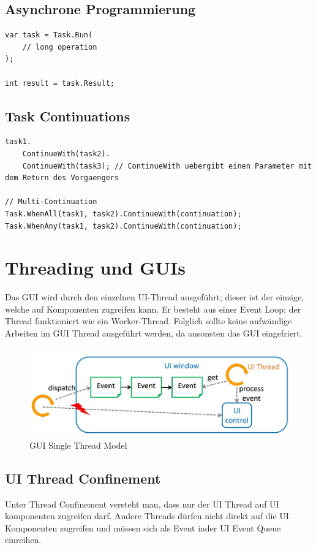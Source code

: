 \subsection{Asynchrone Programmierung}
\begin{lstlisting}[language={[Sharp]C}]
var task = Task.Run(
	// long operation
);

int result = task.Result;
\end{lstlisting}

\subsection{Task Continuations}
\begin{lstlisting}[language={[Sharp]C}]
task1.
	ContinueWith(task2).
	ContinueWith(task3); // ContinueWith uebergibt einen Parameter mit dem Return des Vorgaengers

// Multi-Continuation
Task.WhenAll(task1, task2).ContinueWith(continuation);
Task.WhenAny(task1, task2).ContinueWith(continuation);
\end{lstlisting}


\section{Threading und GUIs}

Das GUI wird durch den einzelnen UI-Thread ausgeführt; dieser ist der einzige, welche auf Komponenten zugreifen kann. Er besteht aus einer Event Loop; der Thread funktioniert wie ein Worker-Thread. Folglich sollte keine aufwändige Arbeiten im GUI Thread ausgeführt werden, da ansonsten das GUI eingefriert. 

\begin{figure}[h!]
	\centering
	\includegraphics[width=0.7\linewidth]{img/gui_thread_model}
	\caption{GUI Single Thread Model}
	\label{fig:guithreadmodel}
\end{figure}

\subsection{UI Thread Confinement}
Unter Thread Confinement versteht man, dass nur der UI Thread auf UI komponenten zugreifen darf. Andere Threads dürfen nicht direkt auf die UI Komponenten zugreifen und müssen sich als Event inder UI Event Queue einreihen.

